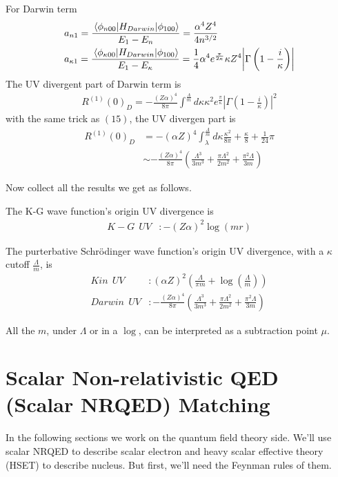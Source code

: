 \documentclass[aps,prd,preprint,showkeys,10pt]{revtex4-1}
\newcommand{\ka}{\kappa}
\begin{document}
For Darwin term
\begin{align*}
	  & a_{n1}=\frac{\mel{\phi_{n00}}{H_{Darwin}}{\phi_{100}}}{E_1-E_n}=\frac{\alpha ^4 Z^4}{4 n^{3/2}}                                                                                     \\
	  & a_{\ka1}=\frac{\mel{\phi_{\ka00}}{H_{Darwin}}{\phi_{100}}}{E_1-E_{\ka}}=\frac{1}{4} \alpha ^4 e^{\frac{\pi }{2 \kappa }} \kappa  Z^4 \abs {\Gamma \left(1-\frac{i}{\kappa }\right)}
\end{align*}
The UV divergent part of Darwin term is
\begin{align}
	R^{(1)}(0)_D=-\frac{(Z\alpha)^4}{8\pi}\int^\frac{\Lambda}{m}d\ka\ka^2e^\frac{\pi}{\ka}|\Gamma(1-\frac{i}{\ka})|^2
\end{align}
with the same trick as $(15)$, the UV divergen part is
\begin{align}
	R^{(1)}(0)_{D} & =-(\alpha Z)^4\int_\lambda^\frac{\Lambda}{m}d\ka\frac{\ka^2}{8\pi}+\frac{\ka}{8}+\frac{1}{24}\pi         \\
	               & \sim -\frac{(Z\alpha)^4}{8\pi}(\frac{\Lambda^3}{3m^3}+\frac{\pi\Lambda^2}{2m^2}+\frac{\pi^2\Lambda}{3m})
\end{align}

Now collect all the results we get as follows.

The K-G wave function's origin UV divergence is
\begin{align}
	K-G\ \ UV & :-(Z\alpha)^2\log(m r)
\end{align}

The purterbative Schr\"odinger wave function's origin UV divergence, with a $\ka$ cutoff $\frac{\Lambda}{m}$, is
\begin{align}
	Kin\ \  UV    & :(\alpha Z)^2(\frac{\Lambda}{\pi m}+\log(\frac{\Lambda}{m}))                                         \\
	Darwin\ \  UV & :-\frac{(Z\alpha)^4}{8\pi}(\frac{\Lambda^3}{3m^3}+\frac{\pi\Lambda^2}{2m^2}+\frac{\pi^2\Lambda}{3m})
\end{align}

All the $m$, under $\Lambda$ or in a $\log$, can be interpreted as a subtraction point $\mu$.

\section{Scalar Non-relativistic QED (Scalar NRQED) Matching\label{sec:fr}}
In the following sections we work on the quantum field theory side. We'll use scalar NRQED to describe scalar electron and heavy scalar effective theory (HSET) to describe nucleus. But first, we'll need the Feynman rules of them.
\end{document}
